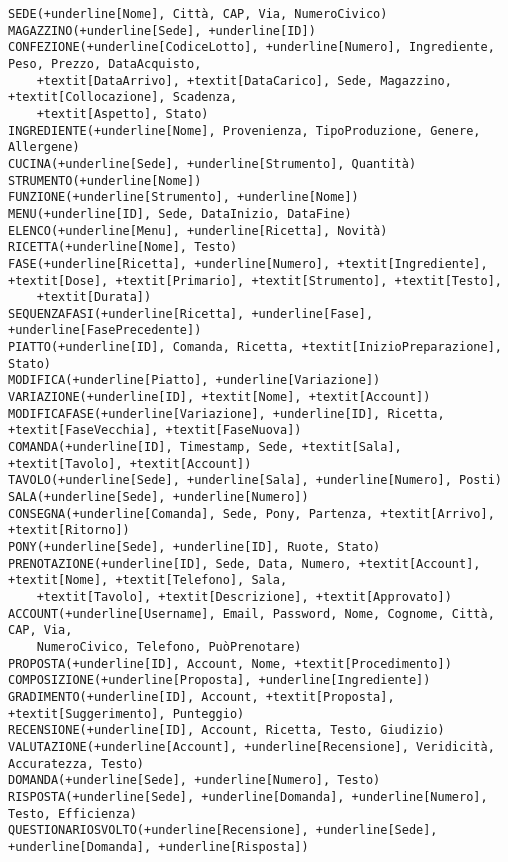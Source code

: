 \begin{Verbatim}[commandchars=+\[\]]
SEDE(+underline[Nome], Città, CAP, Via, NumeroCivico)
MAGAZZINO(+underline[Sede], +underline[ID])
CONFEZIONE(+underline[CodiceLotto], +underline[Numero], Ingrediente, Peso, Prezzo, DataAcquisto,
    +textit[DataArrivo], +textit[DataCarico], Sede, Magazzino, +textit[Collocazione], Scadenza,
    +textit[Aspetto], Stato)
INGREDIENTE(+underline[Nome], Provenienza, TipoProduzione, Genere, Allergene)
CUCINA(+underline[Sede], +underline[Strumento], Quantità)
STRUMENTO(+underline[Nome])
FUNZIONE(+underline[Strumento], +underline[Nome])
MENU(+underline[ID], Sede, DataInizio, DataFine)
ELENCO(+underline[Menu], +underline[Ricetta], Novità)
RICETTA(+underline[Nome], Testo)
FASE(+underline[Ricetta], +underline[Numero], +textit[Ingrediente], +textit[Dose], +textit[Primario], +textit[Strumento], +textit[Testo],
    +textit[Durata])
SEQUENZAFASI(+underline[Ricetta], +underline[Fase], +underline[FasePrecedente])
PIATTO(+underline[ID], Comanda, Ricetta, +textit[InizioPreparazione], Stato)
MODIFICA(+underline[Piatto], +underline[Variazione])
VARIAZIONE(+underline[ID], +textit[Nome], +textit[Account])
MODIFICAFASE(+underline[Variazione], +underline[ID], Ricetta, +textit[FaseVecchia], +textit[FaseNuova])
COMANDA(+underline[ID], Timestamp, Sede, +textit[Sala], +textit[Tavolo], +textit[Account])
TAVOLO(+underline[Sede], +underline[Sala], +underline[Numero], Posti)
SALA(+underline[Sede], +underline[Numero])
CONSEGNA(+underline[Comanda], Sede, Pony, Partenza, +textit[Arrivo], +textit[Ritorno])
PONY(+underline[Sede], +underline[ID], Ruote, Stato)
PRENOTAZIONE(+underline[ID], Sede, Data, Numero, +textit[Account], +textit[Nome], +textit[Telefono], Sala,
    +textit[Tavolo], +textit[Descrizione], +textit[Approvato])
ACCOUNT(+underline[Username], Email, Password, Nome, Cognome, Città, CAP, Via,
    NumeroCivico, Telefono, PuòPrenotare)
PROPOSTA(+underline[ID], Account, Nome, +textit[Procedimento])
COMPOSIZIONE(+underline[Proposta], +underline[Ingrediente])
GRADIMENTO(+underline[ID], Account, +textit[Proposta], +textit[Suggerimento], Punteggio)
RECENSIONE(+underline[ID], Account, Ricetta, Testo, Giudizio)
VALUTAZIONE(+underline[Account], +underline[Recensione], Veridicità, Accuratezza, Testo)
DOMANDA(+underline[Sede], +underline[Numero], Testo)
RISPOSTA(+underline[Sede], +underline[Domanda], +underline[Numero], Testo, Efficienza)
QUESTIONARIOSVOLTO(+underline[Recensione], +underline[Sede], +underline[Domanda], +underline[Risposta])
\end{Verbatim}
